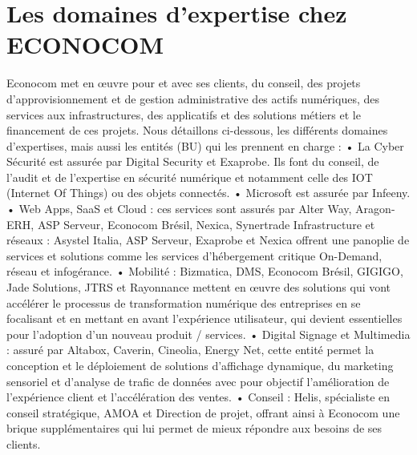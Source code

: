 \section{Les domaines d'expertise chez ECONOCOM}
Econocom met en œuvre pour et avec ses clients, du conseil, des projets  d’approvisionnement et de gestion administrative des actifs numériques, des services aux infrastructures, des applicatifs et des solutions métiers et le financement de ces projets.
Nous détaillons ci-dessous, les différents domaines d’expertises, mais aussi les entités (BU) qui les prennent en charge :
\newline
• La Cyber Sécurité est assurée par Digital Security et Exaprobe. Ils font du conseil, de l’audit et de l’expertise en sécurité numérique et notamment celle des IOT (Internet Of Things) ou des objets connectés.
\newline
•  Microsoft est assurée par Infeeny.
\newline
•  Web Apps, SaaS et Cloud : ces services sont assurés par Alter Way, Aragon-ERH, ASP Serveur, Econocom Brésil, Nexica, Synertrade Infrastructure et réseaux : Asystel Italia, ASP Serveur, Exaprobe et Nexica offrent une panoplie de services et solutions comme les services d’hébergement critique On-Demand, réseau et infogérance.
\newline
•  Mobilité : Bizmatica, DMS, Econocom Brésil, GIGIGO, Jade Solutions, JTRS et Rayonnance mettent en œuvre des solutions qui vont accélérer le processus de transformation numérique des entreprises en se focalisant et en mettant en avant l’expérience utilisateur, qui devient essentielles pour l’adoption d’un nouveau produit / services.
\newline
•  Digital Signage et Multimedia : assuré par Altabox, Caverin, Cineolia, Energy Net, cette entité permet la conception et le déploiement de solutions d’affichage dynamique, du marketing sensoriel et d’analyse de trafic de données avec pour objectif l’amélioration de l’expérience client et l’accélération des ventes.
\newline
• Conseil : Helis, spécialiste en conseil stratégique, AMOA et Direction de projet, offrant ainsi à Econocom une brique supplémentaires qui lui permet de mieux répondre aux besoins de ses clients.

